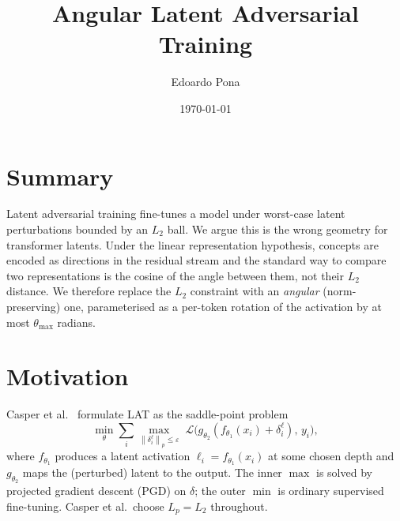 \documentclass[11pt]{article}
\title{Angular Latent Adversarial Training}
\author{Edoardo Pona}
\date{\today}
\newcommand{\thmax}{\theta_{\max}}
\newcommand{\eps}{\varepsilon}
\newcommand{\norm}[1]{\left\lVert#1\right\rVert}
\begin{document}
\maketitle

\section*{Summary}

Latent adversarial training \citep[LAT,][]{casper2024lat} fine-tunes a model under worst-case latent perturbations bounded by an $L_2$ ball. We argue this is the wrong geometry for transformer latents. Under the linear representation hypothesis, concepts are encoded as directions in the residual stream and the standard way to compare two representations is the cosine of the angle between them, not their $L_2$ distance. We therefore replace the $L_2$ constraint with an \emph{angular} (norm-preserving) one, parameterised as a per-token rotation of the activation by at most $\thmax$ radians.

\section{Motivation}

Casper et al.\ \citep{casper2024lat} formulate LAT as the saddle-point problem
\begin{equation}
\min_\theta \sum_i \max_{\norm{\delta_i^\ell}_p \le \eps}\; \mathcal{L}\big(g_{\theta_2}(f_{\theta_1}(x_i) + \delta_i^\ell),\, y_i\big),
\label{eq:lat}
\end{equation}
where $f_{\theta_1}$ produces a latent activation $\ell_i = f_{\theta_1}(x_i)$ at some chosen depth and $g_{\theta_2}$ maps the (perturbed) latent to the output. The inner $\max$ is solved by projected gradient descent (PGD) on $\delta$; the outer $\min$ is ordinary supervised fine-tuning. Casper et al.\ choose $L_p = L_2$ throughout.
\end{document}
